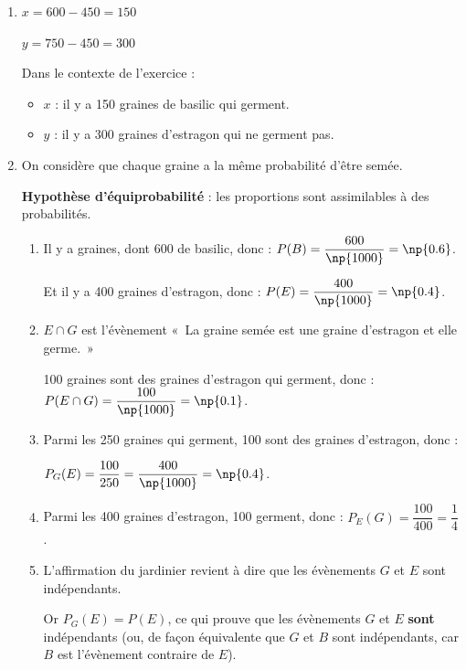 \begin{enumerate}
\item $x = 600 - 450 = 150$

$y = 750 - 450 = 300$

Dans le contexte de l'exercice :
\begin{itemize}
	\item $x$ : il y a 150 graines de basilic qui germent.
	\item $y$ : il y a 300 graines d'estragon qui ne germent pas.
\end{itemize}


\item
On considère que chaque graine a la même probabilité d'être semée.

\textbf{Hypothèse d'équiprobabilité} : les proportions sont assimilables à des probabilités.

\begin{enumerate}
	\item Il y a  graines, dont 600 de basilic, donc :\quad
	$P(B) = \dfrac{600}{\np{1000}} = \np{0.6}$.

	Et il y a 400 graines d'estragon, donc :\quad
	$P(E) = \dfrac{400}{\np{1000}} = \np{0.4}$.

	\item
$E \cap G$ est l'évènement «~La graine semée est une graine d'estragon et elle germe.~»

	100 graines sont des graines d'estragon qui germent, donc :\quad
	$P(E \cap G) = \dfrac{100}{\np{1000}} = \np{0.1}$.



	\item Parmi les 250 graines qui germent, 100 sont des graines d'estragon, donc :

	$P_{G}(E) = \dfrac{100}{250} = \dfrac{400}{\np{1000}} = \np{0.4}$.

	\item Parmi les 400 graines d'estragon, 100 germent, donc : \quad$P_{E}(G) = \dfrac{100}{400} = \dfrac{1}{4}$.

	\item
	L'affirmation du jardinier revient à dire que les évènements $G$ et $E$ sont indépendants.

	Or $P_{G}(E) = P(E)$, ce qui prouve que les évènements $G$ et $E$ \textbf{sont} indépendants (ou, de façon équivalente que $G$ et $B$ sont indépendants, car $B$ est l'évènement contraire de $E$).
	\end{enumerate}
\end{enumerate}
